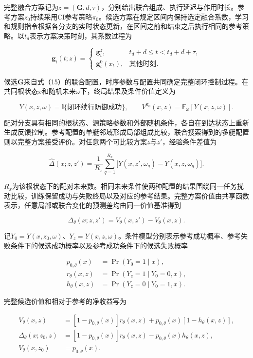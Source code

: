 \documentclass[UTF8,10.5pt,a4paper,fontset=none]{ctexart}
\begin{document}
完整融合方案记为\(z=(\boldsymbol G,d,\tau)\)，分别给出联合组成、执行延迟与作用时长。参考方案\(z_0\)持续采用CI参考策略\(\pi_0\)。候选方案在规定区间内保持选定融合系数，学习和规则指令根据各分支的实时状态更新，在区间之前和结束之后执行相同的参考策略。以\(t_d\)表示方案决策时刻，其系数过程为

\[
\boldsymbol g_i(t;z)=
\begin{cases}
\boldsymbol g_i^z,&t_d+d\le t<t_d+d+\tau,\\
\boldsymbol g_i^0(x_t),&\text{其他时刻}.
\end{cases}
\tag{16}
\]

候选\(\boldsymbol G\)来自式（15）的联合配置，时序参数与配置共同确定完整闭环控制过程。在共同根状态\(x\)和随机未来\(\omega\)下，终局结果及条件价值定义为

\[
Y(x,z,\omega)=\mathbb I\{\text{闭环续行防御成功}\},
\qquad
V^{\pi_0}(x,z)=\mathbb E_\omega[Y(x,z,\omega)].
\tag{17}
\]

配对分支具有相同的根状态、源策略参数和外部随机条件，各自在到达状态上重新生成反馈控制。参考配置的单艇邻域形成局部组成比较，联合搜索得到的多艇配置则以完整方案接受评价。对任意两个可比较方案\(z\)与\(z'\)，经验条件差值为

\[
\widehat\Delta(x;z,z')=
\frac{1}{R_x}\sum_{q=1}^{R_x}
\bigl[Y(x,z',\omega_q)-Y(x,z,\omega_q)\bigr].
\tag{18}
\]

\(R_x\)为该根状态下的配对未来数。相同未来条件使两种配置的结果围绕同一任务扰动比较，训练保留成功与失败终局以及对应的参考结果。完整方案价值由共享函数表示，任意局部或联合变化的预测差均由同一价值基准得到

\[
\Delta_\theta(x;z,z')=V_\theta(x,z')-V_\theta(x,z).
\tag{19}
\]

记\(Y_0=Y(x,z_0,\omega)\)、\(Y_z=Y(x,z,\omega)\)。条件模型分别表示参考成功概率、参考失败条件下的候选成功概率以及参考成功条件下的候选失败概率

\[
\begin{aligned}
p_{0,\theta}(x)&=\Pr(Y_0=1\mid x),\\
r_\theta(x,z)&=\Pr(Y_z=1\mid Y_0=0,x),\\
h_\theta(x,z)&=\Pr(Y_z=0\mid Y_0=1,x).
\end{aligned}
\tag{20}
\]

完整候选价值和相对于参考的净收益写为

\[
\begin{aligned}
V_\theta(x,z)&=[1-p_{0,\theta}(x)]r_\theta(x,z)
+p_{0,\theta}(x)[1-h_\theta(x,z)],\\
\Delta_\theta(x;z_0,z)&=[1-p_{0,\theta}(x)]r_\theta(x,z)
-p_{0,\theta}(x)h_\theta(x,z),\\
V_\theta(x,z_0)&=p_{0,\theta}(x).
\end{aligned}
\tag{21}
\]
\end{document}
